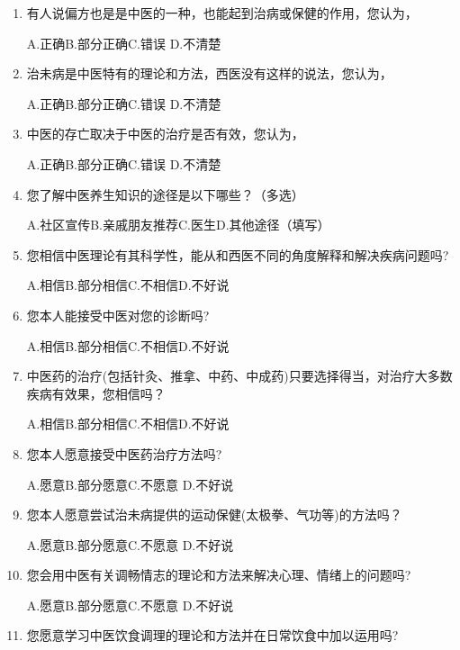 \begin{enumerate}
A.正确\qquad B.部分正确\qquad C.错误 \qquad D.不清楚


\item 有人说偏方也是是中医的一种，也能起到治病或保健的作用，您认为，

A.正确\qquad B.部分正确\qquad C.错误 \qquad D.不清楚

\item 
治未病是中医特有的理论和方法，西医没有这样的说法，您认为，

A.正确\qquad B.部分正确\qquad C.错误 \qquad D.不清楚

\item 中医的存亡取决于中医的治疗是否有效，您认为，

A.正确\qquad B.部分正确\qquad C.错误 \qquad D.不清楚

\item 您了解中医养生知识的途径是以下哪些？（多选）

A.社区宣传\qquad B.亲戚朋友推荐\qquad C.医生\qquad D.其他途径（填写）\underline{\makebox[6em]{}}

\item 
您相信中医理论有其科学性，能从和西医不同的角度解释和解决疾病问题吗?

A.相信\qquad B.部分相信\qquad C.不相信\qquad D.不好说

\item 您本人能接受中医对您的诊断吗?

A.相信\qquad B.部分相信\qquad C.不相信\qquad D.不好说

\item 中医药的治疗(包括针灸、推拿、中药、中成药)只要选择得当，对治疗大多数疾病有效果，您相信吗？

A.相信\qquad B.部分相信\qquad C.不相信\qquad D.不好说

\item 您本人愿意接受中医药治疗方法吗?

A.愿意\qquad B.部分愿意\qquad C.不愿意 \qquad D.不好说

\item 您本人愿意尝试治未病提供的运动保健(太极拳、气功等)的方法吗？

A.愿意\qquad B.部分愿意\qquad C.不愿意 \qquad D.不好说

\item 您会用中医有关调畅情志的理论和方法来解决心理、情绪上的问题吗?

A.愿意\qquad B.部分愿意\qquad C.不愿意 \qquad D.不好说

\item 您愿意学习中医饮食调理的理论和方法并在日常饮食中加以运用吗?


\end{enumerate}
